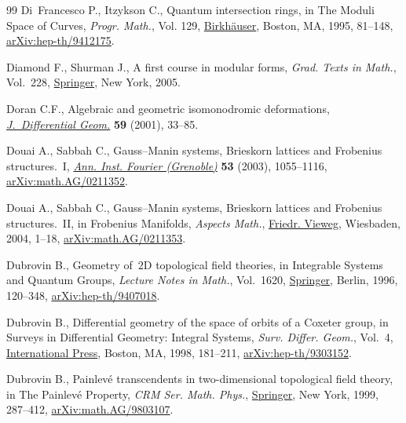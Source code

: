 \documentclass[pdftex]{sigma}
\numberwithin{equation}{section}
\begin{document}
\begin{thebibliography}{99}
Di~Francesco P., Itzykson C., Quantum intersection rings, in The {M}oduli
 {S}pace of {C}urves, \textit{Progr. Math.}, Vol. 129,
 \href{https://doi.org/10.1007/978-1-4612-4264-2_4}{Birkh\"auser}, Boston, MA,
 1995, 81--148,
 \href{http://arxiv.org/abs/hep-th/9412175}{arXiv:hep-th/9412175}.

Diamond F., Shurman J., A first course in modular forms, \textit{Grad. Texts in
 Math.}, Vol.~228, \href{https://doi.org/10.1007/978-0-387-27226-9}{Springer},
 New York, 2005.

Doran C.F., Algebraic and geometric isomonodromic deformations,
 \href{https://doi.org/10.4310/jdg/1090349280}{\textit{J.~Differential Geom.}}
 \textbf{59} (2001), 33--85.

Douai A., Sabbah C., Gauss--{M}anin systems, {B}rieskorn lattices and
 {F}robenius structures.~{I},
 \href{https://doi.org/10.5802/aif.1974}{\textit{Ann. Inst. Fourier
 (Grenoble)}} \textbf{53} (2003), 1055--1116,
 \href{http://arxiv.org/abs/math.AG/0211352}{arXiv:math.AG/0211352}.

Douai A., Sabbah C., Gauss--{M}anin systems, {B}rieskorn lattices and
 {F}robenius structures.~{II}, in Frobenius {M}anifolds, \textit{Aspects Math.},
 \href{https://doi.org/10.1007/978-3-322-80236-1_1}{Friedr. Vieweg},
 Wiesbaden, 2004, 1--18,
 \href{http://arxiv.org/abs/math.AG/0211353}{arXiv:math.AG/0211353}.

Dubrovin B., Geometry of~{$2$}{D} topological field theories, in Integrable
 {S}ystems and {Q}uantum {G}roups, \textit{Lecture Notes in Math.}, Vol.~1620,
 \href{https://doi.org/10.1007/BFb0094793}{Springer}, Berlin, 1996, 120--348,
 \href{http://arxiv.org/abs/hep-th/9407018}{arXiv:hep-th/9407018}.

Dubrovin B., Differential geometry of the space of orbits of a {C}oxeter group,
 in Surveys in {D}ifferential {G}eometry: {I}ntegral {S}ystems, \textit{Surv.
 Differ. Geom.}, Vol.~4,
 \href{https://doi.org/10.4310/SDG.1998.v4.n1.a4}{International Press}, Boston,
 MA, 1998, 181--211,
 \href{http://arxiv.org/abs/hep-th/9303152}{arXiv:hep-th/9303152}.

Dubrovin B., Painlev\'e transcendents in two-dimensional topological field
 theory, in The {P}ainlev\'e Property, \textit{CRM Ser. Math. Phys.},
 \href{https://doi.org/10.1007/978-1-4612-1532-5_6}{Springer}, New York, 1999,
 287--412, \href{http://arxiv.org/abs/math.AG/9803107}{arXiv:math.AG/9803107}.


\end{thebibliography}
\end{document}
